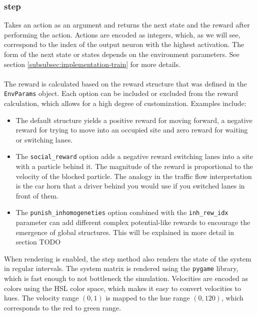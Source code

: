 \subsubsection{step}
Takes an action as an argument and returns the next state and the reward after performing the action. Actions are encoded as integers, which, as we will see, correspond to the index of the output neuron with the highest activation. The form of the next state or states depends on the environment parameters. See section \ref{subsubsec:implementation-train} for more details.
\\
\\
The reward is calculated based on the reward structure that was defined in the \texttt{EnvParams} object. Each option can be included or excluded from the reward calculation, which allows for a high degree of customization. Examples include:
\begin{itemize}
    \item The default structure yields a positive reward for moving forward, a negative reward for trying to move into an occupied site and zero reward for waiting or switching lanes. 
    \item The \texttt{social\_reward} option adds a negative reward switching lanes into a site with a particle behind it. The magnitude of the reward is proportional to the velocity of the blocked particle. The analogy in the traffic flow interpretation is the car horn that a driver behind you would use if you switched lanes in front of them.
    \item The \texttt{punish\_inhomogeneties} option combined with the \texttt{inh\_rew\_idx} parameter can add different complex potential-like rewards to encourage the emergence of global structures. This will be explained in more detail in section TODO
\end{itemize}
When rendering is enabled, the step method also renders the state of the system in regular intervals. The system matrix is rendered using the \texttt{pygame} library, which is fast enough to not bottleneck the simulation. Velocities are encoded as colors using the HSL color space, which makes it easy to convert velocities to hues. The velocity range $(0,1)$ is mapped to the hue range $(0,120)$, which corresponds to the red to green range. 



